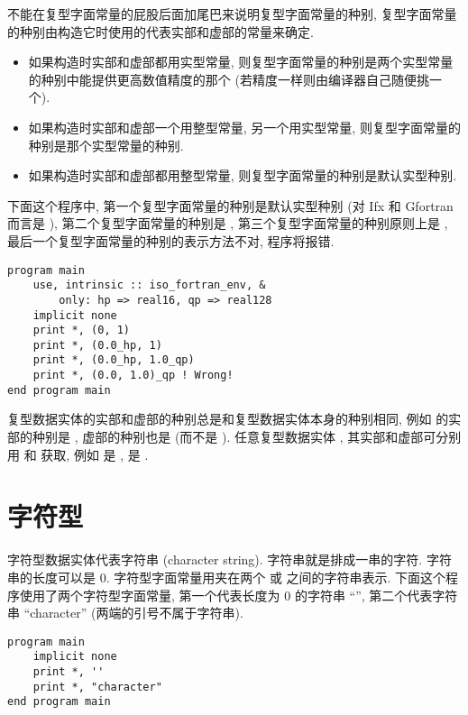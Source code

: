不能在复型字面常量的屁股后面加尾巴来说明复型字面常量的种别, 复型字面常量的种别由构造它时使用的代表实部和虚部的常量来确定.
\begin{itemize}
    \item 如果构造时实部和虚部都用实型常量, 则复型字面常量的种别是两个实型常量的种别中能提供更高数值精度的那个 (若精度一样则由编译器自己随便挑一个).
    \item 如果构造时实部和虚部一个用整型常量, 另一个用实型常量, 则复型字面常量的种别是那个实型常量的种别.
    \item 如果构造时实部和虚部都用整型常量, 则复型字面常量的种别是默认实型种别.
\end{itemize}
下面这个程序中, 第一个复型字面常量的种别是默认实型种别 (对 Ifx 和 Gfortran 而言是 ), 第二个复型字面常量的种别是 , 第三个复型字面常量的种别原则上是 , 最后一个复型字面常量的种别的表示方法不对, 程序将报错.
\begin{lstlisting}
program main
    use, intrinsic :: iso_fortran_env, &
        only: hp => real16, qp => real128
    implicit none
    print *, (0, 1)
    print *, (0.0_hp, 1)
    print *, (0.0_hp, 1.0_qp)
    print *, (0.0, 1.0)_qp ! Wrong!
end program main
\end{lstlisting}

复型数据实体的实部和虚部的种别总是和复型数据实体本身的种别相同, 例如  的实部的种别是 , 虚部的种别也是  (而不是 ). 任意复型数据实体 \ttt{[z]}, 其实部和虚部可分别用  和  获取, 例如  是 ,  是 .

\section{字符型}\label{fortran_char}

字符型数据实体代表字符串 (character string). 字符串就是排成一串的字符. 字符串的长度可以是 $0$. 字符型字面常量用夹在两个  或  之间的字符串表示. 下面这个程序使用了两个字符型字面常量, 第一个代表长度为 $0$ 的字符串 ``'', 第二个代表字符串 ``character'' (两端的引号不属于字符串).
\begin{lstlisting}
program main
    implicit none
    print *, ''
    print *, "character"
end program main
\end{lstlisting}

